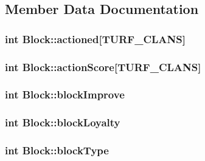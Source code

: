\subsection{Member Data Documentation}
\hypertarget{classBlock_ab23e6326ffa446b8879cff0a7672dd9a}{
\subsubsection[{actioned}]{\setlength{\rightskip}{0pt plus 5cm}int Block\-::actioned\mbox{[}{\bf T\-U\-R\-F\-\_\-\-C\-L\-A\-N\-S}\mbox{]}}}\label{classBlock_ab23e6326ffa446b8879cff0a7672dd9a}
\hypertarget{classBlock_af4947e7e95b6a9a6ad312658f02142f3}{
\subsubsection[{action\-Score}]{\setlength{\rightskip}{0pt plus 5cm}int Block\-::action\-Score\mbox{[}{\bf T\-U\-R\-F\-\_\-\-C\-L\-A\-N\-S}\mbox{]}}}\label{classBlock_af4947e7e95b6a9a6ad312658f02142f3}
\hypertarget{classBlock_ad35fa4c92d80803155062dbd44f53af7}{
\subsubsection[{block\-Improve}]{\setlength{\rightskip}{0pt plus 5cm}int Block\-::block\-Improve}}\label{classBlock_ad35fa4c92d80803155062dbd44f53af7}
\hypertarget{classBlock_a70dbb5221f0c068954a6d43b72a54eca}{
\subsubsection[{block\-Loyalty}]{\setlength{\rightskip}{0pt plus 5cm}int Block\-::block\-Loyalty}}\label{classBlock_a70dbb5221f0c068954a6d43b72a54eca}
\hypertarget{classBlock_a108050a7570c5c5d1de1b83f42a265dc}{
\subsubsection[{block\-Type}]{\setlength{\rightskip}{0pt plus 5cm}int Block\-::block\-Type}}\label{classBlock_a108050a7570c5c5d1de1b83f42a265dc}
